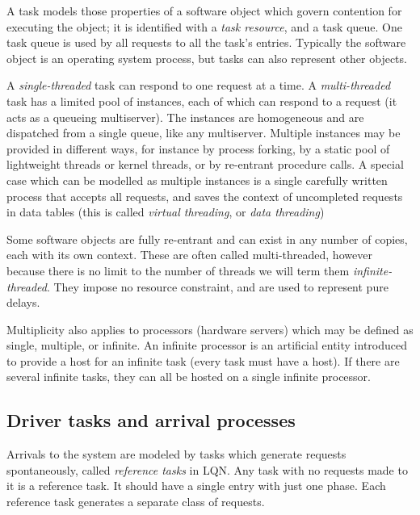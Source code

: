 \documentclass[11pt]{article}
\begin{document}
A task models those properties of a software object which govern contention for executing the
object; it is identified with a \emph{task resource}, and a task queue. One task queue is used by all requests
to all the task's entries. Typically the software object is an operating system process, but tasks can
also represent other objects.

A \emph{single-threaded} task can respond to one request at a time. A \emph{multi-threaded} task has a
limited pool of instances, each of which can respond to a request (it acts as a queueing multiserver).
The instances are homogeneous and are dispatched from a single queue, like any multiserver.
Multiple instances may be provided in different ways, for instance by process forking, by a static
pool of lightweight threads or kernel threads, or by re-entrant procedure calls. A special case which
can be modelled as multiple instances is a single carefully written process that accepts all requests,
and saves the context of uncompleted requests in data tables (this is called \emph{virtual threading}, or \emph{data
threading})

Some software objects are fully re-entrant and can exist in any number of copies, each with its
own context. These are often called multi-threaded, however because there is no limit to the number
of threads we will term them \emph{infinite-threaded}. They impose no resource constraint, and are used to
represent pure delays.

Multiplicity also applies to processors (hardware servers) which may be defined as single,
multiple, or infinite. An infinite processor is an artificial entity introduced to provide a host for an
infinite task (every task must have a host). If there are several infinite tasks, they can all be hosted
on a single infinite processor.

\subsection{Driver tasks and arrival processes}
\label{sec:driver-tasks}

Arrivals to the system are modeled by tasks which generate requests spontaneously, called
\emph{reference tasks} in LQN. Any task with no requests made to it is a reference task. It should have a 
single entry with just one phase. Each reference task generates a separate class of requests.
\end{document}

